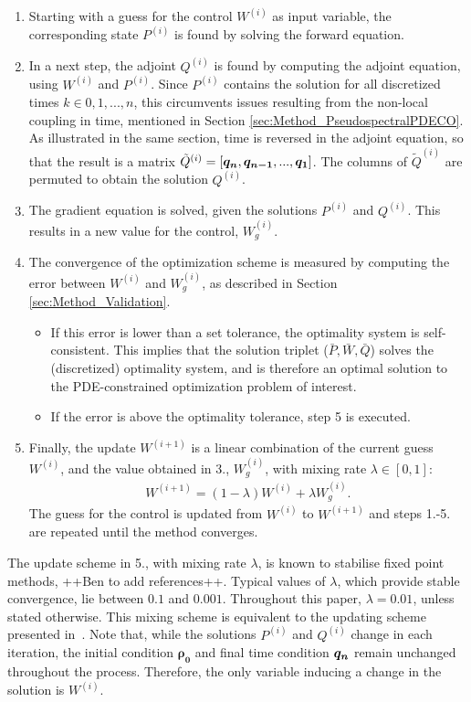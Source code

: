 \begin{enumerate}
	\item Starting with a guess for the control $W^{(i)}$ as input variable, the corresponding state $P^{(i)}$ is found by solving the forward equation.
	\item In a next step, the adjoint $Q^{(i)}$ is found by computing the adjoint equation, using $W^{(i)}$ and $P^{(i)}$. Since $P^{(i)}$ contains the solution for all discretized times $k \in 0,1,...,n$, this circumvents issues resulting from the non-local coupling in time, mentioned in Section \ref{sec:Method_PseudospectralPDECO}. As illustrated in the same section, time is reversed in the adjoint equation, so that the result is a matrix $\tilde{Q}^{(i)} =  [\boldsymbol{q_n},\boldsymbol{q_{n-1}}, ..., \boldsymbol{q_1} ]$. The columns of $\tilde{Q}^{(i)}$ are permuted to obtain the solution  $Q^{(i)}$.
	\item The gradient equation is solved, given the solutions $P^{(i)}$ and $Q^{(i)}$. This results in a new value for the control, $W^{(i)}_g$.
	\item  The convergence of the optimization scheme is measured by computing the error between $W^{(i)}$ and $W^{(i)}_{g}$, as described in Section \ref{sec:Method_Validation}. 
	\begin{itemize}
		\item  If this error is lower than a set tolerance, the optimality system is self-consistent. This implies that the solution triplet ($\bar{P},\bar{W},\bar{Q}$) solves the (discretized) optimality system, and is therefore an optimal solution to the PDE-constrained optimization problem of interest.
		\item If the error is above the optimality tolerance, step 5 is executed.
	\end{itemize}
	\item Finally, the update $W^{(i+1)}$ is a linear combination of the current guess $W^{(i)}$, and the value obtained in 3., $W^{(i)}_{g}$, with mixing rate $\lambda \in [0,1]$:
	\begin{align*}
	W^{(i+1)} = (1-\lambda)W^{(i)} + \lambda W^{(i)}_{g}.
	\end{align*}
	The guess for the control is updated from $W^{(i)} $ to $W^{(i+1)} $ and steps 1.-5. are repeated until the method converges. 
\end{enumerate}
\vspace{0.3cm}
The update scheme in 5., with mixing rate $\lambda$, is known to stabilise fixed point methods, ++Ben to add references++. Typical values of $\lambda$, which provide stable convergence, lie between $0.1$ and $0.001$. Throughout this paper, $\lambda =0.01$, unless stated otherwise. This mixing scheme is equivalent to the updating scheme presented in~\cite{Burger1}. 
Note that, while the solutions $P^{(i)}$ and $Q^{(i)}$ change in each iteration, the initial condition $\boldsymbol{\rho_0}$ and final time condition $\boldsymbol{q_n}$ remain unchanged throughout the process. Therefore, the only variable inducing a change in the solution is $W^{(i)}$.




